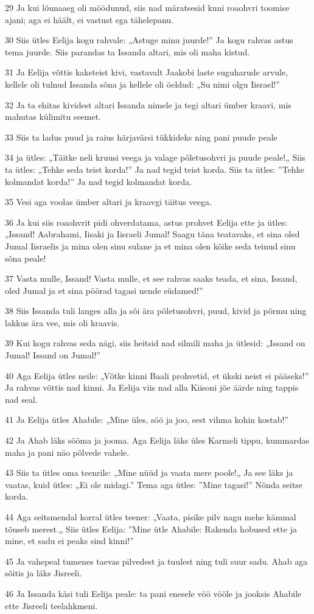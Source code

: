 \par 29 Ja kui lõunaaeg oli möödunud, siis nad märatsesid kuni roaohvri toomise ajani; aga ei häält, ei vastust ega tähelepanu.
\par 30 Siis ütles Eelija kogu rahvale: „Astuge minu juurde!” Ja kogu rahvas astus tema juurde. Siis parandas ta Issanda altari, mis oli maha kistud.
\par 31 Ja Eelija võttis kaksteist kivi, vastavalt Jaakobi laste suguharude arvule, kellele oli tulnud Issanda sõna ja kellele oli öeldud: „Su nimi olgu Iisrael!”
\par 32 Ja ta ehitas kividest altari Issanda nimele ja tegi altari ümber kraavi, mis mahutas külimitu seemet.
\par 33 Siis ta ladus puud ja raius härjavärsi tükkideks ning pani puude peale
\par 34 ja ütles: „Täitke neli kruusi veega ja valage põletusohvri ja puude peale!„ Siis ta ütles: „Tehke seda teist korda!” Ja nad tegid teist korda. Siis ta ütles: ”Tehke kolmandat korda!” Ja nad tegid kolmandat korda.
\par 35 Vesi aga voolas ümber altari ja kraavgi täitus veega.
\par 36 Ja kui siis roaohvrit pidi ohverdatama, astus prohvet Eelija ette ja ütles: „Issand! Aabrahami, Iisaki ja Iisraeli Jumal! Saagu täna teatavaks, et sina oled Jumal Iisraelis ja mina olen sinu sulane ja et mina olen kõike seda teinud sinu sõna peale!
\par 37 Vasta mulle, Issand! Vasta mulle, et see rahvas saaks teada, et sina, Issand, oled Jumal ja et sina pöörad tagasi nende südamed!”
\par 38 Siis Issanda tuli langes alla ja sõi ära põletusohvri, puud, kivid ja põrmu ning lakkus ära vee, mis oli kraavis.
\par 39 Kui kogu rahvas seda nägi, siis heitsid nad silmili maha ja ütlesid: „Issand on Jumal! Issand on Jumal!”
\par 40 Aga Eelija ütles neile: „Võtke kinni Baali prohvetid, et ükski neist ei pääseks!” Ja rahvas võttis nad kinni. Ja Eelija viis nad alla Kiisoni jõe äärde ning tappis nad seal.
\par 41 Ja Eelija ütles Ahabile: „Mine üles, söö ja joo, sest vihma kohin kostab!”
\par 42 Ja Ahab läks sööma ja jooma. Aga Eelija läks üles Karmeli tippu, kummardas maha ja pani näo põlvede vahele.
\par 43 Siis ta ütles oma teenrile: „Mine nüüd ja vaata mere poole!„ Ja see läks ja vaatas, kuid ütles: „Ei ole midagi.” Tema aga ütles: ”Mine tagasi!” Nõnda seitse korda.
\par 44 Aga seitsmendal korral ütles teener: „Vaata, pisike pilv nagu mehe kämmal tõuseb merest.„ Siis ütles Eelija: ”Mine ütle Ahabile: Rakenda hobused ette ja mine, et sadu ei peaks sind kinni!”
\par 45 Ja vahepeal tumenes taevas pilvedest ja tuulest ning tuli suur sadu. Ahab aga sõitis ja läks Jisreeli.
\par 46 Ja Issanda käsi tuli Eelija peale: ta pani enesele vöö vööle ja jooksis Ahabile ette Jisreeli teelahkmeni.

